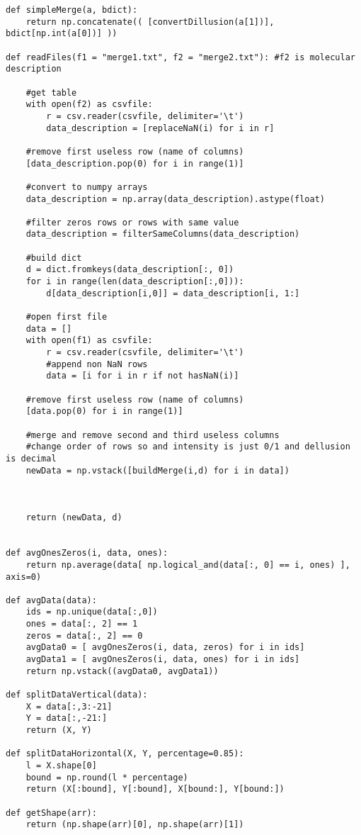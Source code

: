 \documentclass[a4paper,11pt]{article}
\begin{document}
\begin{lstlisting}
def simpleMerge(a, bdict):
    return np.concatenate(( [convertDillusion(a[1])],  bdict[np.int(a[0])] ))

def readFiles(f1 = "merge1.txt", f2 = "merge2.txt"): #f2 is molecular description

    #get table
    with open(f2) as csvfile:
        r = csv.reader(csvfile, delimiter='\t')
        data_description = [replaceNaN(i) for i in r]

    #remove first useless row (name of columns)
    [data_description.pop(0) for i in range(1)]

    #convert to numpy arrays
    data_description = np.array(data_description).astype(float)

    #filter zeros rows or rows with same value
    data_description = filterSameColumns(data_description)

    #build dict
    d = dict.fromkeys(data_description[:, 0])
    for i in range(len(data_description[:,0])):
        d[data_description[i,0]] = data_description[i, 1:]

    #open first file
    data = []
    with open(f1) as csvfile:
        r = csv.reader(csvfile, delimiter='\t')
        #append non NaN rows
        data = [i for i in r if not hasNaN(i)]

    #remove first useless row (name of columns)
    [data.pop(0) for i in range(1)]

    #merge and remove second and third useless columns
    #change order of rows so and intensity is just 0/1 and dellusion is decimal
    newData = np.vstack([buildMerge(i,d) for i in data])



    return (newData, d)


def avgOnesZeros(i, data, ones):
    return np.average(data[ np.logical_and(data[:, 0] == i, ones) ], axis=0)

def avgData(data):
    ids = np.unique(data[:,0])
    ones = data[:, 2] == 1
    zeros = data[:, 2] == 0
    avgData0 = [ avgOnesZeros(i, data, zeros) for i in ids]
    avgData1 = [ avgOnesZeros(i, data, ones) for i in ids]
    return np.vstack((avgData0, avgData1))

def splitDataVertical(data):
    X = data[:,3:-21]
    Y = data[:,-21:]
    return (X, Y)

def splitDataHorizontal(X, Y, percentage=0.85):
    l = X.shape[0]
    bound = np.round(l * percentage)
    return (X[:bound], Y[:bound], X[bound:], Y[bound:])

def getShape(arr):
    return (np.shape(arr)[0], np.shape(arr)[1])


\end{lstlisting}
\end{document}
